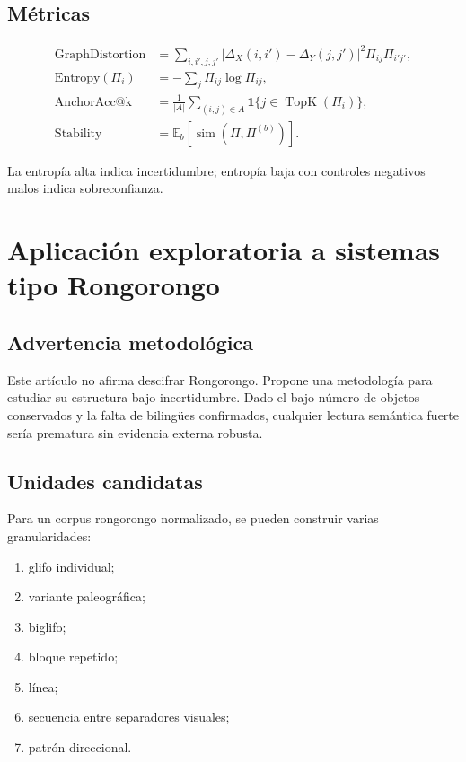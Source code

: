 \documentclass[11pt,a4paper]{article}
\newcommand{\E}{\mathbb{E}}
\newcommand{\1}{\mathbf{1}}
\newcommand{\DX}{\Delta_X}
\newcommand{\DY}{\Delta_Y}
\numberwithin{equation}{section}
\begin{document}
\subsection{Métricas}

\begin{align}
    \mathrm{GraphDistortion}
    &=
    \sum_{i,i',j,j'}
    |\DX(i,i')-\DY(j,j')|^2\Pi_{ij}\Pi_{i'j'},\\
    \mathrm{Entropy}(\Pi_i)
    &=
    -\sum_j\Pi_{ij}\log\Pi_{ij},\\
    \mathrm{AnchorAcc@k}
    &=
    \frac{1}{|A|}
    \sum_{(i,j)\in A}
    \1\{j\in\operatorname{TopK}(\Pi_i)\},\\
    \mathrm{Stability}
    &=
    \E_b
    \left[
    \operatorname{sim}(\Pi,\Pi^{(b)})
    \right].
\end{align}

La entropía alta indica incertidumbre; entropía baja con controles negativos malos indica sobreconfianza.

\section{Aplicación exploratoria a sistemas tipo Rongorongo}

\subsection{Advertencia metodológica}

Este artículo no afirma descifrar Rongorongo. Propone una metodología para estudiar su estructura bajo incertidumbre. Dado el bajo número de objetos conservados y la falta de bilingües confirmados, cualquier lectura semántica fuerte sería prematura sin evidencia externa robusta.

\subsection{Unidades candidatas}

Para un corpus rongorongo normalizado, se pueden construir varias granularidades:
\begin{enumerate}[label=(\roman*)]
    \item glifo individual;
    \item variante paleográfica;
    \item biglifo;
    \item bloque repetido;
    \item línea;
    \item secuencia entre separadores visuales;
    \item patrón direccional.
\end{enumerate}
\end{document}
